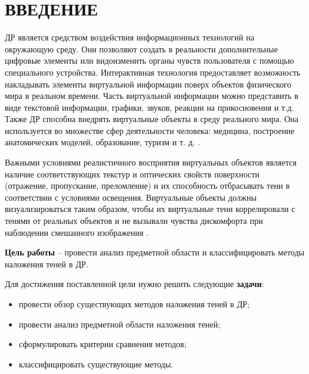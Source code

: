 \chapter*{ВВЕДЕНИЕ}

ДР является средством воздействия информационных технологий на окружающую среду. Они позволяют создать в реальности дополнительные цифровые элементы или видоизменить органы чувств пользователя с помощью специального устройства. Интерактивная технология предоставляет возможность накладывать элементы виртуальной информации поверх объектов физического мира в реальном времени. Часть виртуальной информации можно представить в виде текстовой информации, графики, звуков, реакции на прикосновения и т.д. Также ДР способна внедрять виртуальные объекты в среду реального мира. Она используется во множестве сфер деятельности человека: медицина, построение анатомических моделей, образование, туризм и т. д. \cite{tech-ar}.

Важными условиями реалистичного восприятия виртуальных объектов является наличие соответствующих текстур и оптических свойств поверхности (отражение, пропускание, преломление) и их способность отбрасывать тени в соответствии с условиями освещения. Виртуальные объекты должны визуализироваться таким образом, чтобы их виртуальные тени коррелировали с тенями от реальных объектов и не вызывали чувства дискомфорта при наблюдении смешанного изображения \cite{bogdanov}.

\textbf{Цель работы} -- провести анализ предметной области и классифицировать методы наложения теней в ДР.

Для достижения поставленной цели нужно решить следующие \textbf{задачи}:

\begin{itemize}
	\item провести обзор существующих методов наложения теней в ДР;
	\item провести анализ предметной области наложения теней;
	\item сформулировать критерии сравнения методов;
	\item классифицировать существующие методы.
\end{itemize}